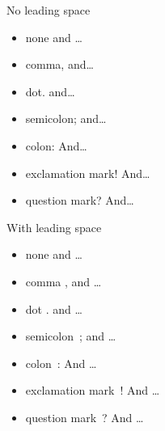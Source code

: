 \documentclass{article}
\begin{document}
No leading space
\begin{itemize}
  \item none and \ldots
  \item comma, and\ldots
  \item dot. and\ldots
  \item semicolon; and\ldots
  \item colon: And\ldots
  \item exclamation mark! And\ldots
  \item question mark? And\ldots
\end{itemize}

With leading space
\begin{itemize}
  \item none  and \ldots
  \item comma , and \ldots
  \item dot . and \ldots
  \item semicolon~; and \ldots
  \item colon~: And \ldots
  \item exclamation mark~! And \ldots
  \item question mark~? And \ldots
\end{itemize}
\end{document}
